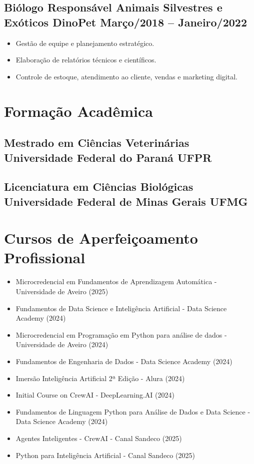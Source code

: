 \documentclass{article}
\begin{document}
\subsection*{Biólogo Responsável \newline Animais Silvestres e Exóticos DinoPet \newline Março/2018 – Janeiro/2022}
\begin{itemize}
    \item Gestão de equipe e planejamento estratégico.
    \item Elaboração de relatórios técnicos e científicos.
    \item Controle de estoque, atendimento ao cliente, vendas e marketing digital.
\end{itemize}

\section*{Formação Acadêmica}

\subsection*{Mestrado em Ciências Veterinárias \newline Universidade Federal do Paraná UFPR }

\subsection*{Licenciatura em Ciências Biológicas \newline Universidade Federal de Minas Gerais UFMG }

\section*{Cursos de Aperfeiçoamento Profissional}

\begin{itemize}
    \item Microcredencial em Fundamentos de Aprendizagem Automática - Universidade de Aveiro (2025)
    \item Fundamentos de Data Science e Inteligência Artificial - Data Science Academy (2024)
    \item Microcredencial em Programação em Python para análise de dados - Universidade de Aveiro (2024)
    \item Fundamentos de Engenharia de Dados - Data Science Academy (2024)
    \item Imersão Inteligência Artificial 2ª Edição - Alura (2024)
    \item Initial Course on CrewAI - DeepLearning.AI (2024)
    \item Fundamentos de Linguagem Python para Análise de Dados e Data Science - Data Science Academy (2024)
    \item Agentes Inteligentes - CrewAI - Canal Sandeco (2025)
    \item Python para Inteligência Artificial - Canal Sandeco (2025)
\end{itemize}
\end{document}

